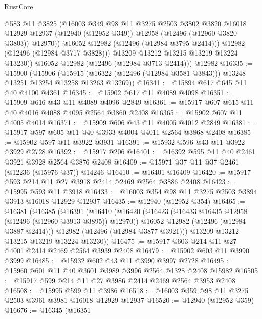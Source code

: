 \begin{lexlean}{RustCore}
\begin{coremodule}
                @583
                @11
                @3825
                (@16003
                  @349
                  @98
                  @11
                  @3275
                  @2503
                  @3802
                  @3820
                  @16018
                  @12929
                  @12937
                  (@12940 (@12952 @349))
                  @12958
                  (@12496 (@12960 @3820 @3803))
                  @12970))
              @16052
              @12982
              (@12496 (@12984 @3795 @2414)))
            @12982
            (@12496 (@12984 @3717 @3828)))
          @13209
          @13212
          @13215
          @13219
          @13224
          @13230))
      @16052
      @12982
      (@12496 (@12984 @3713 @2414)))
    @12982
@16335 := @15900
    (@15906
      (@15915 (@16322 (@12496 (@12984 @3581 @3843))) @13248 @13251 @13254 @13258 @13263 @13269))
@16341 := @15894 @617 @645 @11 @40 @4100 @4361
@16345 := @15902 @617 @11 @4089 @4098
@16351 := @15909 @616 @43 @11 @4089 @4096 @2849
@16361 := @15917 @607 @615 @11 @40 @4016 @4088 @4095 @2564 @3860 @2408
@16365 := @15902 @607 @11 @4005 @4014
@16371 := @15909 @606 @43 @11 @4005 @4012 @2849
@16381 := @15917 @597 @605 @11 @40 @3933 @4004 @4011 @2564 @3868 @2408
@16385 := @15902 @597 @11 @3922 @3931
@16391 := @15932 @596 @43 @11 @3922 @3929 @2728
@16392 := @15917 @206
@16401 := @16392 @595 @11 @40 @2461 @3921 @3928 @2564 @3876 @2408
@16409 := @15971 @37 @11 @37 @2461 (@12236 (@15976 @37)) @14246
@16410 := @16401 @16409
@16420 := @15917 @593 @214 @11 @27 @3918 @2414 @2469 @2564 @3886 @2408
@16423 := @15995 @593 @11 @3918
@16433 := @16003 @354 @98 @11 @3275 @2503 @3894 @3913 @16018 @12929 @12937
@16435 := @12940 (@12952 @354)
@16465 := @16381
    (@16385
      (@16391
        (@16410
          (@16420
            (@16423 (@16433 @16435 @12958 (@12496 (@12960 @3913 @3895)) @12970))
            @16052
            @12982
            (@12496 (@12984 @3887 @2414)))
          @12982
          (@12496 (@12984 @3877 @3921)))
        @13209
        @13212
        @13215
        @13219
        @13224
        @13230))
@16475 := @15917 @603 @214 @11 @27 @4001 @2414 @2469 @2564 @3939 @2408
@16479 := @15902 @603 @11 @3990 @3999
@16485 := @15932 @602 @43 @11 @3990 @3997 @2728
@16495 := @15960 @601 @11 @40 @3601 @3989 @3996 @2564 @1328 @2408 @15982
@16505 := @15917 @599 @214 @11 @27 @3986 @2414 @2469 @2564 @3953 @2408
@16508 := @15995 @599 @11 @3986
@16518 := @16003 @359 @98 @11 @3275 @2503 @3961 @3981 @16018 @12929 @12937
@16520 := @12940 (@12952 @359)
@16676 := @16345
    (@16351

\end{coremodule}
\end{lexlean}
